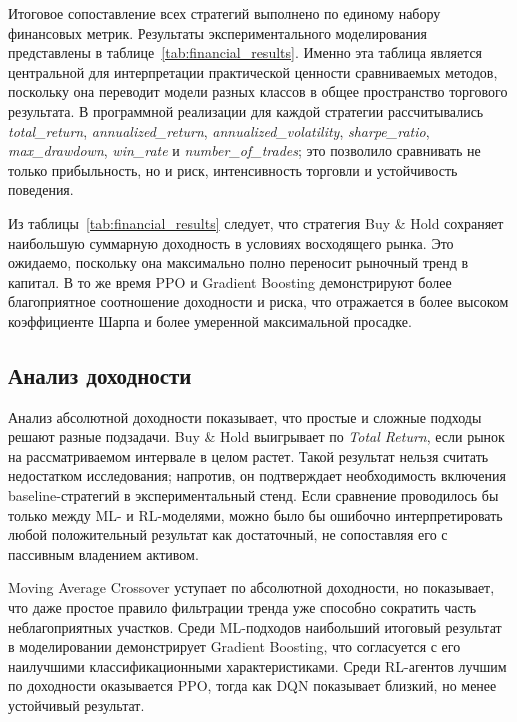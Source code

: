 Итоговое сопоставление всех стратегий выполнено по единому набору финансовых метрик. Результаты экспериментального моделирования представлены в таблице~\ref{tab:financial_results}. Именно эта таблица является центральной для интерпретации практической ценности сравниваемых методов, поскольку она переводит модели разных классов в общее пространство торгового результата. В программной реализации для каждой стратегии рассчитывались \textit{total\_return}, \textit{annualized\_return}, \textit{annualized\_volatility}, \textit{sharpe\_ratio}, \textit{max\_drawdown}, \textit{win\_rate} и \textit{number\_of\_trades}; это позволило сравнивать не только прибыльность, но и риск, интенсивность торговли и устойчивость поведения.



Из таблицы~\ref{tab:financial_results} следует, что стратегия Buy \& Hold сохраняет наибольшую суммарную доходность в условиях восходящего рынка. Это ожидаемо, поскольку она максимально полно переносит рыночный тренд в капитал. В то же время PPO и Gradient Boosting демонстрируют более благоприятное соотношение доходности и риска, что отражается в более высоком коэффициенте Шарпа и более умеренной максимальной просадке.

\subsection{Анализ доходности}

Анализ абсолютной доходности показывает, что простые и сложные подходы решают разные подзадачи. Buy \& Hold выигрывает по \textit{Total Return}, если рынок на рассматриваемом интервале в целом растет. Такой результат нельзя считать недостатком исследования; напротив, он подтверждает необходимость включения baseline-стратегий в экспериментальный стенд. Если сравнение проводилось бы только между ML- и RL-моделями, можно было бы ошибочно интерпретировать любой положительный результат как достаточный, не сопоставляя его с пассивным владением активом.

Moving Average Crossover уступает по абсолютной доходности, но показывает, что даже простое правило фильтрации тренда уже способно сократить часть неблагоприятных участков. Среди ML-подходов наибольший итоговый результат в моделировании демонстрирует Gradient Boosting, что согласуется с его наилучшими классификационными характеристиками. Среди RL-агентов лучшим по доходности оказывается PPO, тогда как DQN показывает близкий, но менее устойчивый результат.

